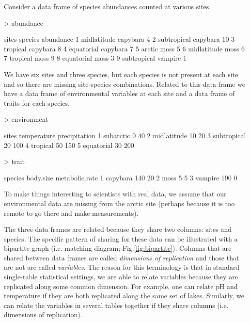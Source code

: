 \documentclass[a4paper]{report}
\begin{document}
\begin{article}
Consider a data frame of species abundances counted at various sites.
\begin{Schunk}
\begin{Sinput}
> abundance
\end{Sinput}
\begin{Soutput}
        sites  species abundance
1 midlatitude capybara         4
2 subtropical capybara        10
3    tropical capybara         8
4  equatorial capybara         7
5      arctic     moss         5
6 midlatitude     moss         6
7    tropical     moss         9
8  equatorial     moss         3
9 subtropical  vampire         1
\end{Soutput}
\end{Schunk}
We have six sites and three species, but each species is not present at each site and so there are missing site-species combinations.  Related to this  data frame we have a data frame of environmental variables at each site and a data frame of traits for each species.
\begin{Schunk}
\begin{Sinput}
> environment
\end{Sinput}
\begin{Soutput}
        sites temperature precipitation
1   subarctic           0            40
2 midlatitude          10            20
3 subtropical          20           100
4    tropical          50           150
5  equatorial          30           200
\end{Soutput}
\begin{Sinput}
> trait
\end{Sinput}
\begin{Soutput}
   species body.size metabolic.rate
1 capybara       140             20
2     moss         5              5
3  vampire       190              0
\end{Soutput}
\end{Schunk}
To make things interesting to scientists with real data, we assume that our environmental data are missing from the arctic site (perhaps because it is too remote to go there and make measurements).

The three data frames are related because they share two columns:  sites and species.  The specific pattern of sharing for these data can be illustrated with a bipartite graph (i.e. matching diagram; Fig.\ref{fig:bipartite}).  Columns that are shared between data frames are called \emph{dimensions of replication} and those that are not are called \emph{variables}.  The reason for this terminology is that in standard single-table statistical settings, we are able to relate variables because they are replicated along some common dimension.  For example, one can relate pH and temperature if they are both replicated along the same set of lakes.  Similarly, we can relate the variables in several tables together if they share columns (i.e. dimensions of replication).


\end{article}
\end{document}
